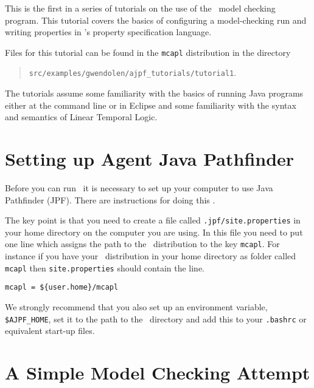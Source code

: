 \label{tutorial:ajpf:psl}

This is the first in a series of tutorials on the use of the \ajpf\ model checking program.  This tutorial covers the basics of configuring a model-checking run and writing properties in \ajpf's property specification language.

Files for this tutorial can be found in the \texttt{mcapl} distribution in the directory 
\begin{quote}
\texttt{src/examples/gwendolen/ajpf\_tutorials/tutorial1}.
\end{quote}

The tutorials assume some familiarity with the basics of running Java programs either at the command line or in Eclipse and some familiarity with the syntax and semantics of Linear Temporal Logic.

\section{Setting up Agent Java Pathfinder}
Before you can run \ajpf\ it is necessary to set up your computer to use Java Pathfinder (JPF).  There are instructions for doing this .

The key point is that you need to create a file called \texttt{.jpf/site.properties} in your home directory on the computer you are using.  In this file you need to put one line which assigns the path to the \mcapl\ distribution to the key \texttt{mcapl}.  For instance if you have your \mcapl\ distribution in your home directory as  folder called \texttt{mcapl} then \texttt{site.properties} should contain the line.

\begin{verbatim}
mcapl = ${user.home}/mcapl
\end{verbatim}

\begin{sloppypar}
We strongly recommend that you also set up an environment variable, \texttt{\$AJPF\_HOME}, set it to the path to the \mcapl\ directory and add this to your \texttt{.bashrc} or equivalent start-up files.
\end{sloppypar}

\section{A Simple Model Checking Attempt}

